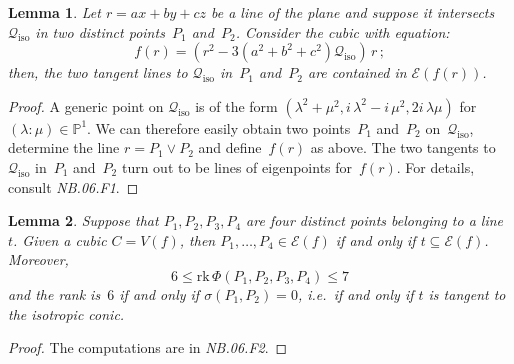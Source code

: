 \documentclass[a4paper, 11pt, reqno]{amsart}
\theoremstyle{plain}
\newtheorem{lemma}{Lemma}[section]
\theoremstyle{definition}
\newcommand{\p}{\mathbb{P}}
\newcommand{\nb}[2]{\textsl{{NB}.{#1}.{#2}}}
\newcommand{\iii}{\textit{i}\,}
\newcommand{\rk}{\ensuremath{\mathrm{rk}}}
\newcommand{\iso}{\mathcal{Q}_{\mathrm{iso}}}
\newcommand{\Eig}[1]{\mathcal{E}\!\left( {#1} \right)}
\begin{document}
\begin{lemma}
\label{lemma:twoTangentsCiso} Let $r = ax+by+cz$ be a line of the plane 
and suppose it intersects $\iso$ in two
distinct points~$P_1$ and~$P_2$. Consider the cubic with equation:
\begin{equation}
\label{2_lines_of_eigenpoints}
  f(r) = \left( r^2-3\left(a^2+b^2+c^2\right)\iso \right) \, r \,;
\end{equation}
then, the two tangent lines to $\iso$ in~$P_1$ and~$P_2$
are contained in $\Eig {f(r)}$.
\end{lemma}
\begin{proof}
A generic point on $\iso$ is of the form $(\lambda^2 + \mu^2, 
\iii\lambda^2 -\iii\mu^2, 2\iii\lambda \mu)$ for $(\lambda: \mu) \in \p^1$.
We can therefore easily obtain two points~$P_1$ and~$P_2$ on~$\iso$,
determine the line $r = P_1 \vee P_2$ and define~$f(r)$ as above.
The two tangents to~$\iso$ in~$P_1$ and~$P_2$ turn out to be lines of eigenpoints
for~$f(r)$. For details, consult \nb{06}{F1}.
\end{proof}


\begin{lemma}
\label{lemma:four_points_on_line}
Suppose that $P_1, P_2, P_3, P_4$ are four distinct points belonging to a line~$t$.
Given a cubic $C=V(f)$, then $P_1, \dotsc, P_4 \in \Eig{f}$ if and only if
$t \subseteq \Eig{f}$.
Moreover,
%
\begin{equation*}
  6 \leq \rk \,\Phi(P_1, P_2, P_3, P_4) \leq 7
\end{equation*}
%
and the rank is~$6$ if and only if $\sigma(P_1, P_2) = 0$, i.e.\ if
and only if $t$ is tangent to the isotropic conic.
\end{lemma}
\begin{proof}
The computations are in \nb{06}{F2}.
\end{proof}
\end{document}
